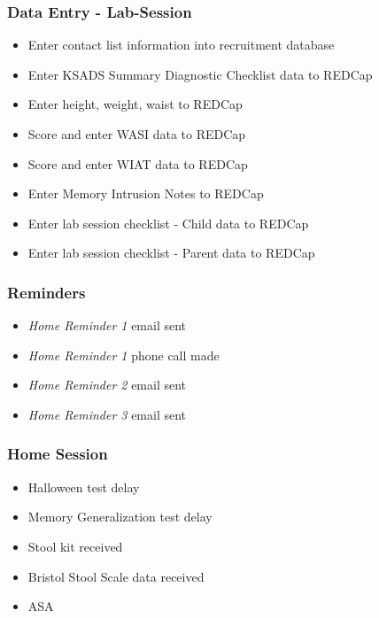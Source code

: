 \documentclass[]{book}
\providecommand{\tightlist}{%
  \setlength{\itemsep}{0pt}\setlength{\parskip}{0pt}}
\begin{document}
\hypertarget{data-entry---lab-session}{%
\subsubsection{Data Entry - Lab-Session}\label{data-entry---lab-session}}

\begin{itemize}
\tightlist
\item
  Enter contact list information into recruitment database
\item
  Enter KSADS Summary Diagnostic Checklist data to REDCap
\item
  Enter height, weight, waist to REDCap
\item
  Score and enter WASI data to REDCap
\item
  Score and enter WIAT data to REDCap
\item
  Enter Memory Intrusion Notes to REDCap
\item
  Enter lab session checklist - Child data to REDCap
\item
  Enter lab session checklist - Parent data to REDCap
\end{itemize}

\hypertarget{reminders}{%
\subsubsection{Reminders}\label{reminders}}

\begin{itemize}
\tightlist
\item
  \emph{Home Reminder 1} email sent
\item
  \emph{Home Reminder 1} phone call made
\item
  \emph{Home Reminder 2} email sent
\item
  \emph{Home Reminder 3} email sent
\end{itemize}

\hypertarget{home-session}{%
\subsubsection{Home Session}\label{home-session}}

\begin{itemize}
\tightlist
\item
  Halloween test delay
\item
  Memory Generalization test delay
\item
  Stool kit received
\item
  Bristol Stool Scale data received
\item
  ASA
\end{itemize}
\end{document}
